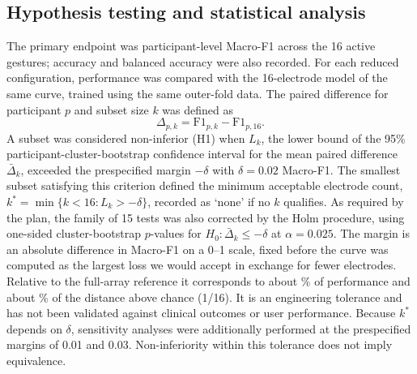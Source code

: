 \subsection[Hypothesis testing and statistical analysis]{Hypothesis testing and statistical analysis}
\label{sec:statistics}

The primary endpoint was participant-level Macro-F1 across the 16 active gestures; accuracy and balanced accuracy were also recorded. For each reduced configuration, performance was compared with the 16-electrode model of the same curve, trained using the same outer-fold data. The paired difference for participant $p$ and subset size $k$ was defined as
\begin{equation}
\Delta_{p,k} = \mathrm{F1}_{p,k} - \mathrm{F1}_{p,16}.
\end{equation}
A subset was considered non-inferior (H1) when $L_k$, the lower bound of the 95\% participant-cluster-bootstrap confidence interval for the mean paired difference $\bar\Delta_k$, exceeded the prespecified margin $-\delta$ with $\delta = 0.02$ Macro-F1. The smallest subset satisfying this criterion defined the minimum acceptable electrode count, $k^* = \min\{k < 16 : L_k > -\delta\}$, recorded as `none' if no $k$ qualifies. As required by the plan, the family of 15 tests was also corrected by the Holm procedure, using one-sided cluster-bootstrap $p$-values for $H_0\colon \bar\Delta_k \le -\delta$ at $\alpha = 0.025$. The margin is an absolute difference in Macro-F1 on a 0--1 scale, fixed before the curve was computed as the largest loss we would accept in exchange for fewer electrodes. Relative to the full-array reference it corresponds to about \MarginPctOfRef\% of performance and about \MarginPctAboveChance\% of the distance above chance (1/16). It is an engineering tolerance and has not been validated against clinical outcomes or user performance. Because $k^*$ depends on $\delta$, sensitivity analyses were additionally performed at the prespecified margins of 0.01 and 0.03. Non-inferiority within this tolerance does not imply equivalence.

